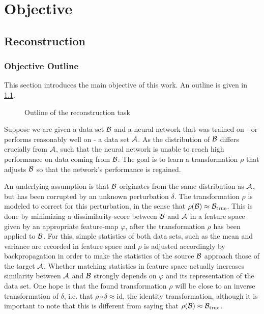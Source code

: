 \chapter{Objective}
\label{chap:Objective}





\section{Reconstruction}
\label{sec:Reconstruction}

\subsection{Objective Outline}
This section introduces the main objective of this work. An outline is given in \cref{fig:outline}.
\begin{figure}[h]
    \centering
    
    \caption{Outline of the reconstruction task}
    \label{fig:outline}
    \centering
\end{figure}


Suppose we are given a data set $\mathcal B$ 
and a neural network that was trained on - or performs reasonably well on - a data set $\mathcal A$.
As the distribution of $\mathcal B$ differs crucially from $\mathcal A$, 
such that the neural network is unable to reach high performance on data coming from $\mathcal B$.
The goal is to learn a transformation $\rho$ that adjusts $\mathcal B$ 
so that the network's performance is regained.

An underlying assumption is that $\mathcal B$ originates from the same distribution
as $\mathcal A$, but has been corrupted by an unknown perturbation $\delta$.
The transformation $\rho$ is modeled to correct for this perturbation, 
in the sense that $\rho(\mathcal B) \approx \mathcal B_\text{true}$.
This is done by minimizing a dissimilarity-score between $\mathcal B$ and $\mathcal A$ 
in a feature space given by an appropriate feature-map $\varphi$, 
after the transformation $\rho$ has been applied to $\mathcal B$.
For this, simple statistics of both data sets, such as the mean and variance 
are recorded in feature space and $\rho$ is adjusted accordingly by backpropagation 
in order to make the statistics of the source $\mathcal B$ approach those of the target $\mathcal A$.
%
Whether matching statistics in feature space actually increases similarity between $\mathcal A$ and $\mathcal B$
strongly depends on $\varphi$ and its representation of the data set.
%
One hope is that the found transformation $\rho$ will be close to an inverse transformation
of $\delta$, i.e. that $\rho\circ\delta \approx \text{id}$, the identity transformation,
although it is important to note that this is different from saying that $\rho(\mathcal B) \approx \mathcal B_\text{true}$.


